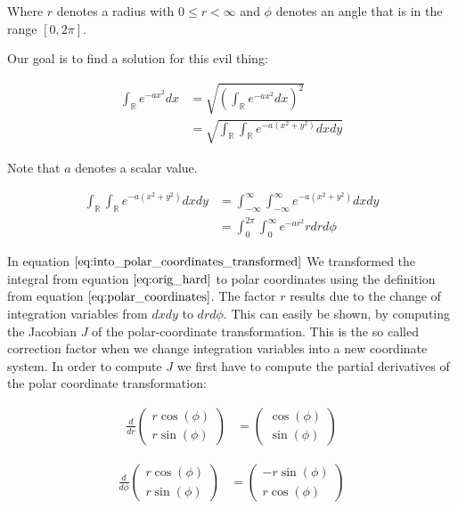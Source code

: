 \documentclass{paper}
\begin{document}
Where $r$ denotes a radius with $0 \leq r < \infty$ and $\phi$ denotes an angle that is in the range $[0,2\pi]$.

Our goal is to find a solution for this evil thing:

\begin{align}
    \int_{\mathbb{R}} e^{-ax^2} dx 
    &= \sqrt{\left(\int_{\mathbb{R}} e^{-ax^2} dx\right)^2} \\
    &= \sqrt{\int_{\mathbb{R}} \int_{\mathbb{R}} e^{-a(x^2 + y^2)} dx dy}
\label{eq:orig_hard}
\end{align}

Note that $a$ denotes a scalar value.

\begin{align}
    \int_{\mathbb{R}} \int_{\mathbb{R}} e^{-a(x^2 + y^2)} dx dy 
    & = \int_{-\infty}^{\infty} \int_{-\infty}^{\infty} e^{-a(x^2 + y^2)} dx dy \\
    &= \int_{0}^{2 \pi} \int_{0}^{\infty} e^{-ar^2} r dr d\phi
\label{eq:into_polar_coordinates_transformed}
\end{align}

In equation $\ref{eq:into_polar_coordinates_transformed}$ We transformed the integral from equation $\ref{eq:orig_hard}$ to polar coordinates using the definition from equation $\ref{eq:polar_coordinates}$. The factor $r$ results due to the change of integration variables from $dx dy$ to $dr d\phi$. This can easily be shown, by computing the Jacobian $J$ of the polar-coordinate transformation. This is the so called correction factor when we change integration variables into a new coordinate system. In order to compute $J$ we first have to compute the partial derivatives of the polar coordinate transformation:

\begin{align}
    \frac{d}{dr} \begin{pmatrix}r \cos(\phi)\\r \sin(\phi)\end{pmatrix} 
    &= \begin{pmatrix} \cos(\phi)\\ \sin(\phi)\end{pmatrix}
\end{align}

\begin{align}
    \frac{d}{d\phi} \begin{pmatrix}r \cos(\phi)\\r \sin(\phi)\end{pmatrix} 
    &= \begin{pmatrix}-r \sin(\phi)\\ r \cos(\phi)\end{pmatrix}
\end{align}
\end{document}
